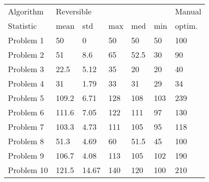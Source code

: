 \begin{tabular}{lllllll}
\toprule
Algorithm & \multicolumn{5}{l}{Reversible} & Manual \\
Statistic &       mean &    std &  max &   med &  min & optim. \\
\midrule
Problem 1  &         50 &      0 &   50 &    50 &   50 &    100 \\
Problem 2  &         51 &    8.6 &   65 &  52.5 &   30 &     90 \\
Problem 3  &       22.5 &   5.12 &   35 &    20 &   20 &     40 \\
Problem 4  &         31 &   1.79 &   33 &    31 &   29 &     34 \\
Problem 5  &      109.2 &   6.71 &  128 &   108 &  103 &    239 \\
Problem 6  &      111.6 &   7.05 &  122 &   111 &   97 &    130 \\
Problem 7  &      103.3 &   4.73 &  111 &   105 &   95 &    118 \\
Problem 8  &       51.3 &   4.69 &   60 &  51.5 &   45 &    100 \\
Problem 9  &      106.7 &   4.08 &  113 &   105 &  102 &    190 \\
Problem 10 &      121.5 &  14.67 &  140 &   120 &  100 &    210 \\
\bottomrule
\end{tabular}
